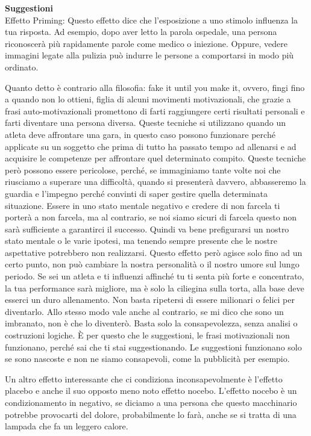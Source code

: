 \documentclass[12pt]{book} %
\begin{document}
\bigskip

\noindent \textbf{\large Suggestioni} \\
Effetto Priming: Questo effetto dice che
l'esposizione a uno stimolo influenza la tua risposta.
Ad esempio, dopo aver letto la parola ospedale, una persona riconoscerà più rapidamente parole come medico o iniezione. Oppure, vedere immagini legate alla pulizia può indurre le persone a comportarsi in modo più ordinato.

Quanto detto è contrario alla filosofia: fake it until you make it, ovvero, fingi fino a quando non lo ottieni, figlia
di alcuni movimenti motivazionali, che grazie a frasi auto-motivazionali promettono di farti raggiungere certi risultati
personali e farti diventare una persona diversa. Queste tecniche si
utilizzano quando un atleta deve affrontare una gara, in questo caso possono funzionare perché applicate su un soggetto che prima di tutto ha passato tempo ad allenarsi e ad acquisire le competenze per affrontare quel determinato compito. Queste tecniche però possono essere pericolose, perché, se
immaginiamo tante volte noi che riusciamo a superare una difficoltà, quando si presenterà davvero, abbasseremo la
guardia e l'impegno perché convinti di saper gestire quella determinata situazione. Essere in uno
stato mentale negativo e credere di non farcela ti porterà a non farcela, ma al contrario, se noi siamo sicuri di
farcela questo non sarà sufficiente a garantirci il successo. Quindi va bene prefigurarsi un nostro stato mentale o le
varie ipotesi, ma tenendo sempre presente che le nostre aspettative potrebbero non realizzarsi. Questo effetto però
agisce solo fino ad un certo punto, non può cambiare la nostra personalità o il nostro umore sul lungo periodo. Se sei
un atleta e ti influenzi affinché tu ti senta più forte e concentrato, la tua performance sarà migliore, ma è solo la
ciliegina sulla torta, alla base deve esserci un duro allenamento. Non basta ripetersi di essere milionari o felici
per diventarlo. Allo stesso modo vale anche al contrario, se mi dico che sono un imbranato, non è che lo diventerò.
Basta solo la consapevolezza, senza analisi o costruzioni logiche. È per questo che le suggestioni, le frasi
motivazionali non funzionano, perché sai che ti stai suggestionando. Le suggestioni funzionano solo se sono nascoste e
non ne siamo consapevoli, come la pubblicità per esempio. 

Un altro effetto interessante che ci condiziona inconsapevolmente è l'effetto placebo e anche il
suo opposto meno noto effetto nocebo. L'effetto nocebo è un condizionamento in negativo, se
diciamo a una persona che questo macchinario potrebbe provocarti del dolore, probabilmente lo farà, anche se si tratta
di una lampada che fa un leggero calore.
\end{document}
